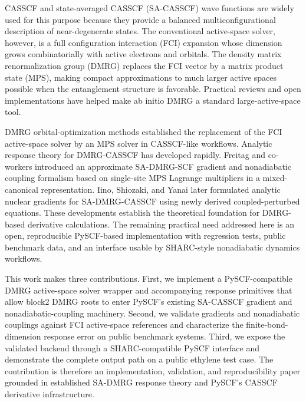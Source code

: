 \documentclass[journal=jctcce,manuscript=article]{achemso}
\begin{document}
CASSCF and state-averaged CASSCF (SA-CASSCF) wave functions are widely used
for this purpose because they provide a balanced multiconfigurational
description of near-degenerate states.\cite{Roos1980CASSCF,KnowlesWerner1985MCSCF}
The conventional active-space solver,
however, is a full configuration interaction (FCI) expansion whose dimension
grows combinatorially with active electrons and orbitals.  The density matrix
renormalization group (DMRG) replaces the FCI vector by a matrix product state
(MPS), making compact approximations to much larger active spaces possible
when the entanglement structure is favorable.\cite{White1992DMRG,WhiteMartin1999DMRG,RommerOstlund1997MPS,ChanHeadGordon2002,ChanSharma2011,SharmaChan2012}
Practical reviews and open implementations have helped make ab initio DMRG a
standard large-active-space tool.\cite{Wouters2014DMRGReview,OlivaresAmaya2015DMRGPractice,Wouters2014CheMPS2}

DMRG orbital-optimization methods established the replacement of the FCI
active-space solver by an MPS solver in CASSCF-like workflows.\cite{ZgidNooijen2008,Ghosh2008}
Analytic response theory for DMRG-CASSCF has developed rapidly.  Freitag and
co-workers introduced an approximate SA-DMRG-SCF gradient and nonadiabatic
coupling formalism based on single-site MPS Lagrange multipliers in a
mixed-canonical representation.\cite{Freitag2019}  Iino, Shiozaki, and Yanai
later formulated analytic nuclear gradients for SA-DMRG-CASSCF using newly
derived coupled-perturbed equations.\cite{Iino2023}  These developments
establish the theoretical foundation for DMRG-based derivative calculations.
The remaining practical need addressed here is an open, reproducible
PySCF-based implementation with regression tests, public benchmark data, and
an interface usable by SHARC-style nonadiabatic dynamics workflows.

This work makes three contributions.  First, we implement a
PySCF-compatible DMRG active-space solver wrapper and accompanying response
primitives that allow block2 DMRG roots to enter PySCF's existing
SA-CASSCF gradient and nonadiabatic-coupling machinery.  Second, we validate
gradients and nonadiabatic couplings against FCI active-space references and
characterize the finite-bond-dimension response error on public benchmark
systems.  Third, we expose the validated backend through a SHARC-compatible
PySCF interface and demonstrate the complete output path on a public ethylene
test case.  The contribution is therefore an implementation, validation, and
reproducibility paper grounded in established SA-DMRG response theory and
PySCF's CASSCF derivative infrastructure.
\end{document}
